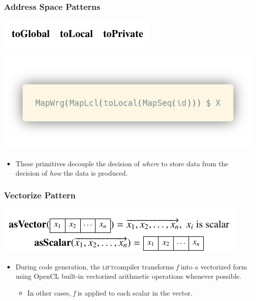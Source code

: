 \documentclass[10pt,usetotalslideindicator]{beamer}
\newcommand{\lift}{\textsc{lift}\space}
\begin{document}
\begin{frame}
\frametitle{Address Space Patterns}
    \begin{block}{}
        \begin{center}
            \includegraphics[width=.55\textwidth]{../images/address_space_patterns.pdf}
        \end{center}
        \begin{center}
            \includegraphics[width=.55\textwidth]{../images/toLocal.png}
        \end{center}
    \end{block}
\begin{itemize}
    \item These primitives decouple the decision of \textit{where} to store data from the decision of \textit{how} the data is produced.
\end{itemize}
\end{frame}

\begin{frame}
\frametitle{Vectorize Pattern}
    \begin{block}{}
        \begin{center}
            \includegraphics[width=.85\textwidth]{../images/vectorize_pattern.pdf}
        \end{center}
    \end{block}
\begin{itemize}
    \item During code generation, the \lift compiler transforms \textit{f} into a vectorized form using OpenCL built-in vectorized arithmetic operations whenever possible.
	\begin{itemize}
	    \item In other cases, \textit{f} is applied to each scalar in the vector.
    \end{itemize}
\end{itemize}
\end{frame}
\end{document}
